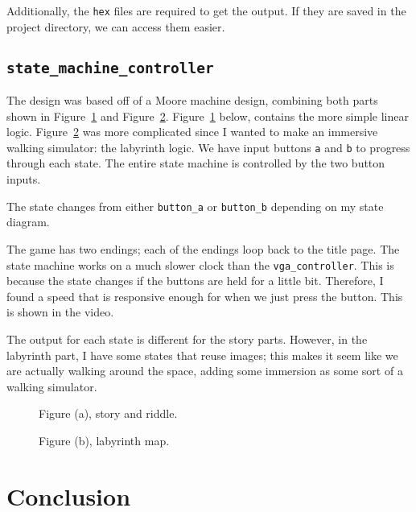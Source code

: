 \documentclass{article}
\begin{document}
Additionally, the \texttt{hex} files are required to get the output. If they are saved in the project directory, we can access them easier.

\subsection{\texttt{state\_machine\_controller}}

The design was based off of a Moore machine design, combining both parts shown in Figure~\ref{fig:story} and Figure~\ref{fig:labyrinth}. Figure~\ref{fig:story} below, contains the more simple linear logic. Figure~\ref{fig:labyrinth} was more complicated since I wanted to make an immersive walking simulator: the labyrinth logic. We have input buttons \texttt{a} and \texttt{b} to progress through each state. The entire state machine is controlled by the two button inputs.

The state changes from either \texttt{button\_a} or \texttt{button\_b} depending on my state diagram.

The game has two endings; each of the endings loop back to the title page. The state machine works on a much slower clock than the \texttt{vga\_controller}. This is because the state changes if the buttons are held for a little bit. Therefore, I found a speed that is responsive enough for when we just press the button. This is shown in the video.

The output for each state is different for the story parts. However, in the labyrinth part, I have some states that reuse images; this makes it seem like we are actually walking around the space, adding some immersion as some sort of a walking simulator.

\begin{figure}[htbp]
    \centering
    \fbox{\rule{0pt}{4cm}\rule{0.8\linewidth}{0pt}}
    \caption{Figure (a), story and riddle.}
    \label{fig:story}
\end{figure}

\begin{figure}[htbp]
    \centering
    \fbox{\rule{0pt}{4cm}\rule{0.8\linewidth}{0pt}}
    \caption{Figure (b), labyrinth map.}
    \label{fig:labyrinth}
\end{figure}


\section{Conclusion}
\end{document}
